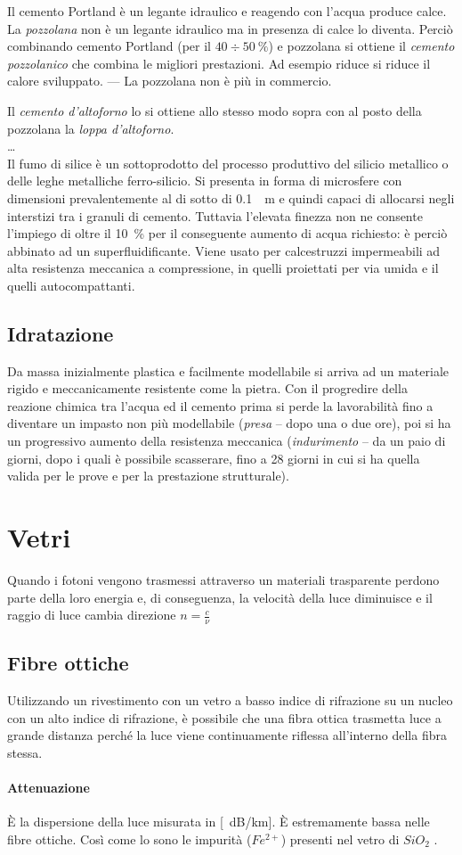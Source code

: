 \documentclass[a5paper,12pt]{article}
\newcommand{\e}{\`E\xspace}  %
\begin{document}
Il cemento Portland è un legante idraulico e reagendo con l'acqua produce calce. La \emph{pozzolana} non è un legante idraulico ma in presenza di calce lo diventa. Perciò combinando cemento Portland (per il $40\div\SI{50}{\%}$) e pozzolana si ottiene il \emph{cemento pozzolanico} che combina le migliori prestazioni. Ad esempio riduce si riduce il calore sviluppato. --- La pozzolana non è più in commercio.

Il \emph{cemento d'altoforno} lo si ottiene allo stesso modo sopra con al posto della pozzolana la \emph{loppa d'altoforno}.\\ \dots\\
Il fumo di silice è un sottoprodotto del processo produttivo del silicio metallico o delle leghe metalliche ferro-silicio. Si presenta in forma di microsfere con dimensioni prevalentemente al di sotto di \SI{0.1}{\mu m} e quindi capaci di allocarsi negli interstizi tra i granuli di cemento. Tuttavia l'elevata finezza non ne consente l'impiego di oltre il \SI{10}{\%} per il conseguente aumento di acqua richiesto: è perciò abbinato ad un superfluidificante. Viene usato per calcestruzzi impermeabili ad alta resistenza meccanica a compressione, in quelli proiettati per via umida e il quelli autocompattanti. 
\subsection{Idratazione}
Da massa inizialmente plastica e facilmente modellabile si arriva ad un materiale rigido e meccanicamente resistente come la pietra. Con il progredire della reazione chimica tra l'acqua ed il cemento prima si perde la lavorabilità fino a diventare un impasto non più modellabile (\emph{presa} -- dopo una o due ore), poi si ha un progressivo aumento della resistenza meccanica (\emph{indurimento} -- da un paio di giorni, dopo i quali è possibile scasserare, fino a 28 giorni in cui si ha quella valida per le prove e per la prestazione strutturale).
\section{Vetri}
Quando i fotoni vengono trasmessi attraverso un materiali trasparente perdono parte della loro energia e, di conseguenza, la velocità della luce diminuisce e il raggio di luce cambia direzione $n=\frac{c}{\nu}$
\subsection{Fibre ottiche}
Utilizzando un rivestimento con un vetro a basso indice di rifrazione su un nucleo con un alto indice di rifrazione, è possibile che una fibra ottica trasmetta luce a grande distanza perché la luce viene continuamente riflessa all'interno della fibra stessa.
\paragraph{Attenuazione} \e la dispersione della luce misurata in [\SI{}{dB/km}]. \e estremamente bassa nelle fibre ottiche. Così come lo sono le impurità ($Fe^{2+ }$) presenti nel vetro di $SiO_2$ .
\end{document}
